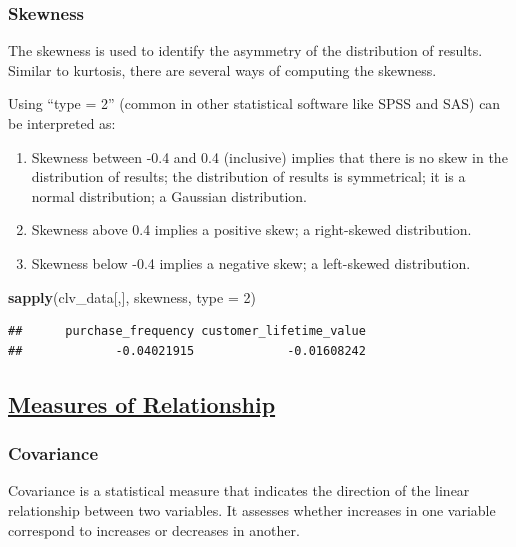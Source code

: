 \documentclass[
]{article}
\newenvironment{Shaded}{\begin{snugshade}}{\end{snugshade}}
\newcommand{\AttributeTok}[1]{\textcolor[rgb]{0.13,0.29,0.53}{#1}}
\newcommand{\DecValTok}[1]{\textcolor[rgb]{0.00,0.00,0.81}{#1}}
\newcommand{\FunctionTok}[1]{\textcolor[rgb]{0.13,0.29,0.53}{\textbf{#1}}}
\newcommand{\NormalTok}[1]{#1}
\begin{document}
\subsubsection{\texorpdfstring{\textbf{Skewness}}{Skewness}}\label{skewness}

The skewness is used to identify the asymmetry of the distribution of
results. Similar to kurtosis, there are several ways of computing the
skewness.

Using ``type = 2'' (common in other statistical software like SPSS and
SAS) can be interpreted as:

\begin{enumerate}
\def\labelenumi{\arabic{enumi}.}
\item
  Skewness between -0.4 and 0.4 (inclusive) implies that there is no
  skew in the distribution of results; the distribution of results is
  symmetrical; it is a normal distribution; a Gaussian distribution.
\item
  Skewness above 0.4 implies a positive skew; a right-skewed
  distribution.
\item
  Skewness below -0.4 implies a negative skew; a left-skewed
  distribution.
\end{enumerate}

\begin{Shaded}
\begin{Highlighting}[]
\FunctionTok{sapply}\NormalTok{(clv\_data[,], skewness, }\AttributeTok{type =} \DecValTok{2}\NormalTok{)}
\end{Highlighting}
\end{Shaded}

\begin{verbatim}
##      purchase_frequency customer_lifetime_value 
##             -0.04021915             -0.01608242
\end{verbatim}

\subsection{\texorpdfstring{\ul{\textbf{Measures of
Relationship}}}{Measures of Relationship}}\label{measures-of-relationship}

\subsubsection{\texorpdfstring{\textbf{Covariance}}{Covariance}}\label{covariance}

Covariance is a statistical measure that indicates the direction of the
linear relationship between two variables. It assesses whether increases
in one variable correspond to increases or decreases in
another.\hspace{0pt}
\end{document}
